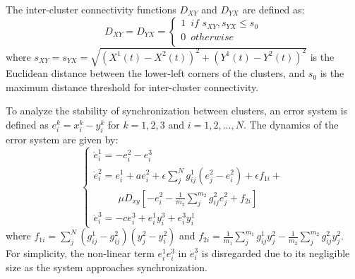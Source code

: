 \documentclass[10pt]{article}
\begin{document}
The inter-cluster connectivity functions $D_{XY}$ and $D_{YX}$ are defined as:
$$
D_{XY} = D_{YX}  = \left\{ \begin{array}{l}
 1\,\,\,if\,\,s_{XY},s_{YX}  \le s_0  \\
 0\,\,\,otherwise \\
 \end{array} \right.
$$
where $s_{XY} = s_{YX} = \sqrt {{{\left( {{X^1}(t) - {X^2}(t)} \right)}^2} + {{\left( {{Y^1}(t) - {Y^2}(t)} \right)}^2}}$ is the Euclidean distance between the lower-left corners of the clusters, and $s_0$ is the maximum distance threshold for inter-cluster connectivity.

To analyze the stability of synchronization between clusters, an error system is defined as $e_i^k = x_i^k - y_i^k$ for $k=1,2,3$ and $i=1,2,...,N$. The dynamics of the error system are given by:
$$
\left\{ \begin{array}{l}
\dot e_i^1 =  - e_i^2 - e_i^3\\
\dot e_i^2 = e_i^1 + ae_i^2 + \epsilon \sum\limits_j^N {{g_{ij}^1\left( {e_j^2 - e_i^2} \right) }} + \epsilon {f_{1i}} + \\
\,\,\,\,\,\,\,\,\,\,\,\,\,\,\,\mu {D_{xy}}\left[ { - e_i^2 - \frac{1}{{{m_2}}}\sum\limits_j^{{m_2}} {g _{ij}^2e_j^2}  + {f_{2i}}} \right]\\
\dot e_i^3 =  - ce_i^3 + e_i^1y_i^3 + e_i^3y_i^1
\end{array} \right.
$$
where ${f_{1i}} = \sum\limits_j^{{N}} {\left( {g_{ij}^1 - g_{ij}^2} \right)\left( {y_j^2 - y_i^2} \right)}$ and ${f_{2i}} = \frac{1}{{{m_1}}}\sum\limits_j^{{m_1}} {g _{ij}^1y_j^2}  - \frac{1}{{{m_2}}}\sum\limits_j^{{m_2}} {g _{ij}^2y_j^2}$. For simplicity, the non-linear term $e_i^1 e_i^3$ in $\dot e_i^3$ is disregarded due to its negligible size as the system approaches synchronization.
\end{document}
